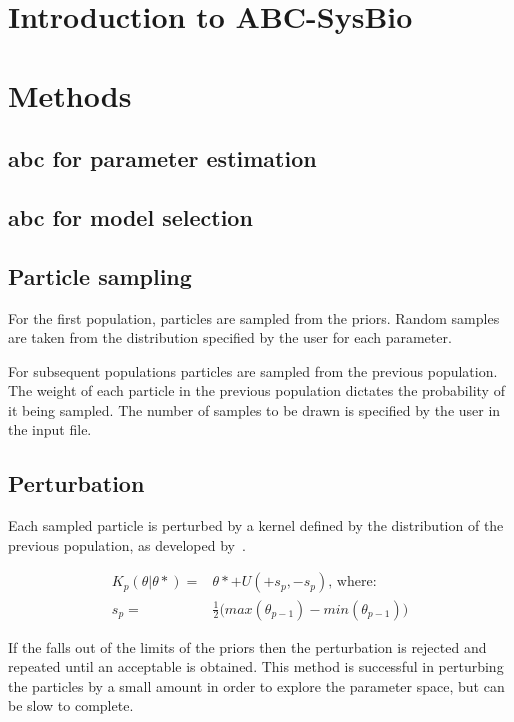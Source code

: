\section{Introduction to ABC-SysBio}







\section{Methods}
\subsection{\acrshort{abc} for parameter estimation}



\subsection{\acrshort{abc} for model selection}
\subsection{Particle sampling}
\label{sec:part_samp}
For the first population, particles are sampled from the priors. Random samples are taken from the distribution specified by the user for each parameter. 

For subsequent populations particles are sampled from the previous population. The weight of each particle in the previous population dictates the probability of it being sampled. The number of samples to be drawn is specified by the user in the input file.  

\subsection{Perturbation}
\label{sec:pertub}
Each sampled particle is perturbed by a kernel defined by the distribution of the previous population, as developed by~\textcite{Toni:2009tr}. 

\begin{align}
K_p(\theta|\theta* ) =& \theta* + U(+s_p, -s_p)\text{, where:} \\
s_p =& \frac{1}{2} \big (max(\theta_{p-1}) - min(\theta_{p-1}) \big )
\end{align}

If the \texttheta* falls out of the limits of the priors then the perturbation is rejected and repeated until an acceptable \texttheta* is obtained. This method is successful in perturbing the particles by a small amount in order to explore the parameter space, but can be slow to complete. 

